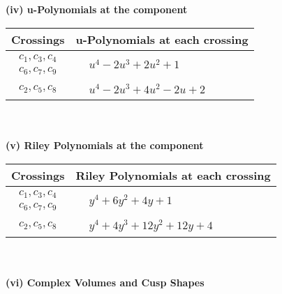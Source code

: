 \documentclass[1p]{elsarticle_modified}
\theoremstyle{definition}
\begin{document}
\newpage\renewcommand{\arraystretch}{1}
\flushleft \textbf{(iv) u-Polynomials at the component}\newline \\
\begin{tabular}{m{50pt}|m{274pt}}
Crossings & \hspace{64pt}u-Polynomials at each crossing \\
\hline $$\begin{aligned}c_{1},c_{3},c_{4}\\c_{6},c_{7},c_{9}\end{aligned}$$&$\begin{aligned}
&u^4-2 u^3+2 u^2+1
\end{aligned}$\\
\hline $$\begin{aligned}c_{2},c_{5},c_{8}\end{aligned}$$&$\begin{aligned}
&u^4-2 u^3+4 u^2-2 u+2
\end{aligned}$\\
\hline
\end{tabular}\\~\\
\newpage\renewcommand{\arraystretch}{1}
\flushleft \textbf{(v) Riley Polynomials at the component}\newline \\
\begin{tabular}{m{50pt}|m{274pt}}
Crossings & \hspace{64pt}Riley Polynomials at each crossing \\
\hline $$\begin{aligned}c_{1},c_{3},c_{4}\\c_{6},c_{7},c_{9}\end{aligned}$$&$\begin{aligned}
&y^4+6 y^2+4 y+1
\end{aligned}$\\
\hline $$\begin{aligned}c_{2},c_{5},c_{8}\end{aligned}$$&$\begin{aligned}
&y^4+4 y^3+12 y^2+12 y+4
\end{aligned}$\\
\hline
\end{tabular}\\~\\
\newpage\flushleft \textbf{(vi) Complex Volumes and Cusp Shapes}
\end{document}
